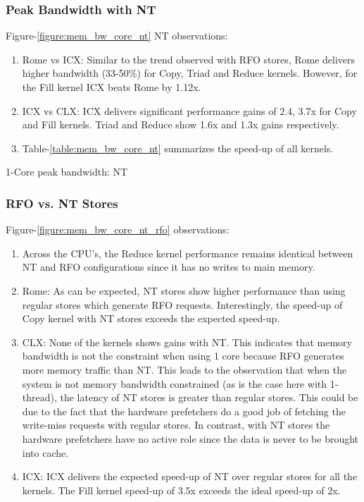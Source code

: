 \documentclass{article}
\begin{document}
\subsubsection{Peak Bandwidth with NT}

Figure-\ref{figure:mem_bw_core_nt} NT observations:
\begin{enumerate}
\item Rome vs ICX: Similar to the trend observed with RFO stores, Rome delivers higher bandwidth (33-50\%) for Copy, Triad and Reduce kernels. However, for the Fill kernel ICX beats Rome by 1.12x.
\item ICX vs CLX: ICX delivers significant performance gains of 2.4, 3.7x for Copy and Fill kernels. Triad and Reduce show 1.6x and 1.3x gains respectively.
\item Table-\ref{table:mem_bw_core_nt} summarizes the speed-up of all kernels.
\end{enumerate}


\begin{table}[h!]
\centering

\caption{1-Core peak bandwidth: NT}
\label{table:mem_bw_core_nt}
\end{table}

\subsubsection{RFO vs. NT Stores}

Figure-\ref{figure:mem_bw_core_nt_rfo} observations:
\begin{enumerate}
\item Across the CPU's, the Reduce kernel performance remains identical between NT and RFO configurations since it has no writes to main memory.
\item Rome: As can be expected, NT stores show higher performance than using regular stores which generate RFO requests. Interestingly, the speed-up of Copy kernel with NT stores exceeds the expected speed-up.
\item CLX: None of the kernels shows gains with NT. This indicates that memory bandwidth is not the constraint when using 1 core because RFO generates more memory traffic than NT. This leads to the observation that when the system is not memory bandwidth constrained (as is the case here with 1-thread), the latency of NT stores is greater than regular stores. This could be due to the fact that the hardware prefetchers do a good job of fetching the write-miss requests with regular stores. In contrast, with NT stores the hardware prefetchers have no active role since the data is never to be brought into cache.
\item ICX: ICX delivers the expected speed-up of NT over regular stores for all the kernels. The Fill kernel speed-up of 3.5x exceeds the ideal speed-up of 2x.
\end{enumerate}
\end{document}
